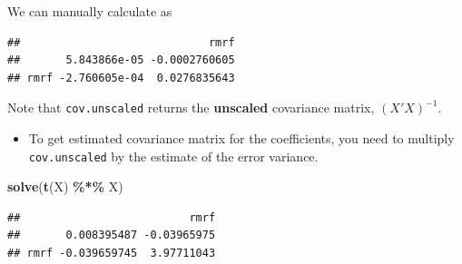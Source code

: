 \documentclass[
  a4paper,
  twoside,
  openright]{book}
\newenvironment{Shaded}{\begin{snugshade}}{\end{snugshade}}
\newcommand{\CommentTok}[1]{\textcolor[rgb]{0.56,0.35,0.01}{\textit{#1}}}
\newcommand{\ConstantTok}[1]{\textcolor[rgb]{0.56,0.35,0.01}{#1}}
\newcommand{\DecValTok}[1]{\textcolor[rgb]{0.00,0.00,0.81}{#1}}
\newcommand{\FunctionTok}[1]{\textcolor[rgb]{0.13,0.29,0.53}{\textbf{#1}}}
\newcommand{\NormalTok}[1]{#1}
\newcommand{\OtherTok}[1]{\textcolor[rgb]{0.56,0.35,0.01}{#1}}
\newcommand{\SpecialCharTok}[1]{\textcolor[rgb]{0.81,0.36,0.00}{\textbf{#1}}}
\providecommand{\tightlist}{%
  \setlength{\itemsep}{0pt}\setlength{\parskip}{0pt}}
\theoremstyle{definition}
\theoremstyle{definition}
\theoremstyle{definition}
\theoremstyle{definition}
\theoremstyle{remark}
\begin{document}
We can manually calculate as

\begin{Shaded}
\end{Shaded}

\begin{verbatim}
##                             rmrf
##       5.843866e-05 -0.0002760605
## rmrf -2.760605e-04  0.0276835643
\end{verbatim}

Note that \texttt{cov.unscaled} returns the \textbf{unscaled} covariance matrix, \((X'X)^{-1}\).

\begin{itemize}
\tightlist
\item
  To get estimated covariance matrix for the coefficients, you need to multiply \texttt{cov.unscaled} by the estimate of the error variance.
\end{itemize}

\begin{Shaded}
\begin{Highlighting}[]
\FunctionTok{solve}\NormalTok{(}\FunctionTok{t}\NormalTok{(X) }\SpecialCharTok{\%*\%}\NormalTok{ X)}
\end{Highlighting}
\end{Shaded}

\begin{verbatim}
##                          rmrf
##       0.008395487 -0.03965975
## rmrf -0.039659745  3.97711043
\end{verbatim}
\end{document}
